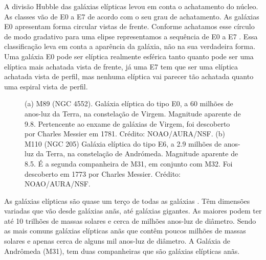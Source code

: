 A divisão Hubble das galáxias elípticas levou em conta o achatamento do núcleo. As classes vão de E0 a E7 de acordo com o seu grau de achatamento. As galáxias E0 apresentam forma circular vistas de frente. Conforme achatamos esse círculo de modo gradativo para uma elipse representamos a sequência de E0 a E7 \cite{bergh1998galaxy}. Essa classificação leva em conta a aparência da galáxia, não na sua verdadeira forma. Uma galáxia E0 pode ser elíptica realmente esférica tanto quanto pode ser uma elíptica mais achatada vista de frente, já uma E7 tem que ser uma elíptica achatada vista de perfil, mas nenhuma elíptica vai parecer tão achatada quanto uma espiral vista de perfil. 
\begin{figure}[ht!] 
\centering 
{}
\qquad 
{} 
\caption{(a) M89 (NGC 4552). Galáxia elíptica do tipo E0, a 60 milhões de anos-luz da Terra, na constelação de Virgem. Magnitude aparente de 9.8. Pertencente ao enxame de galáxias de Virgem, foi descoberto por Charles Messier em 1781. Crédito: NOAO/AURA/NSF. \newline  (b) M110 (NGC 205) Galáxia elíptica do tipo E6, a 2.9 milhões de anos-luz da Terra, na constelação de Andrómeda. Magnitude aparente de 8.5. É a segunda companheira de M31, em conjunto com M32. Foi descoberto em 1773 por Charles Messier. Crédito: NOAO/AURA/NSF.} 
\label{fig:galáxiasElipticas} 
\end{figure} 

As galáxias elípticas são quase um terço de todas as galáxias \cite{extragalatic}. Têm dimensões variadas que vão desde galáxias anãs, até galáxias gigantes. As maiores podem ter até 10 trilhões de massas solares e cerca de milhões anos-luz de diâmetro. Sendo as mais comuns galáxias elípticas anãs que contêm poucos milhões de massas solares e apenas cerca de alguns mil anos-luz de diâmetro. A Galáxia de Andrômeda (M31), tem duas companheiras que são galáxias elípticas anãs. 

